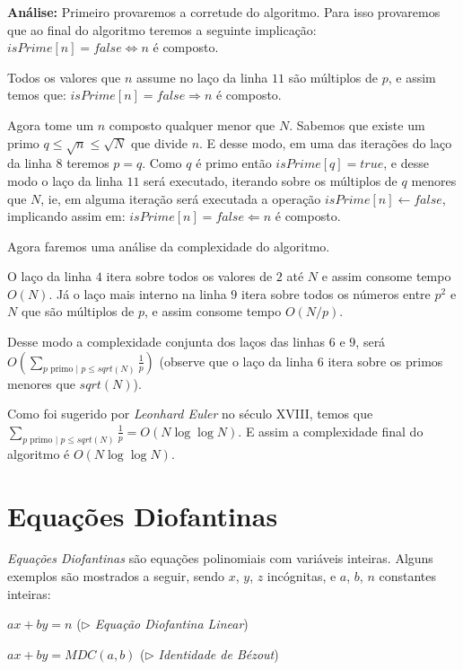 \textbf{Análise:}
Primeiro provaremos a corretude do algoritmo. Para isso provaremos que ao final do algoritmo teremos a seguinte implicação:
$isPrime[n] = false \Leftrightarrow n$ é composto.

Todos os valores que $n$ assume no laço da linha $11$ são múltiplos de $p$, e assim temos que: $isPrime[n] = false \Rightarrow n$ é composto.

Agora tome um $n$ composto qualquer menor que $N$. Sabemos que existe um primo $q \leq \sqrt{n} \leq \sqrt{N}$ que divide $n$. 
E desse modo, em uma das iterações do laço da linha $8$ teremos $p=q$. Como $q$ é primo então $isPrime[q]=true$, e desse modo
o laço da linha $11$ será executado, iterando sobre os múltiplos de $q$ menores que $N$, ie, em alguma iteração será executada 
a operação $isPrime[n]\gets false$, implicando assim em: $isPrime[n] = false \Leftarrow n$ é composto.

Agora faremos uma análise da complexidade do algoritmo.

O laço da linha $4$ itera sobre todos os valores de $2$ até $N$ e assim consome tempo $O(N)$.
Já o laço mais interno na linha $9$ itera sobre todos os números entre $p^2$ e $N$ que são múltiplos de $p$, e assim consome tempo
$O(N/p)$. 

Desse modo a complexidade conjunta dos laços das linhas $6$ e $9$, será $O(\sum_{p \text{ primo | }p\leq sqrt(N)} \frac{1}{p})$
(observe que o laço da linha $6$ itera sobre os primos menores que $sqrt(N)$). 

Como foi sugerido por \textit{Leonhard Euler} no século XVIII, temos que $\sum_{p \text{ primo | }p\leq sqrt(N)} \frac{1}{p} = O(N\log \log N)$. E assim a complexidade final do algoritmo é $O(N \log \log N)$.

\section{Equações Diofantinas}

\textit{Equações Diofantinas} são equações polinomiais com variáveis inteiras. Alguns exemplos são mostrados a seguir, sendo $x$, $y$, $z$ incógnitas, e $a$, $b$, $n$ constantes inteiras:

$ax + by = n$ ($\triangleright$ \textit{Equação Diofantina Linear})

$ax + by = MDC(a,b)$ ($\triangleright$ \textit{Identidade de Bézout})

